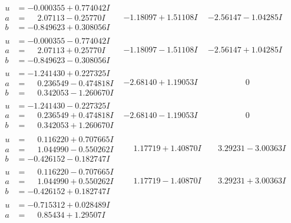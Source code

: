 \documentclass[1p]{elsarticle_modified}
\theoremstyle{definition}
\begin{document}
$$\begin{array}{c|c|c}
 \hline 
\begin{aligned}
u &= -0.000355 + 0.774042 I \\
a &= \phantom{-}2.07113 - 0.25770 I \\
b &= -0.849623 + 0.308056 I\end{aligned}
 & -1.18097 + 1.51108 I & -2.56147 - 1.04285 I \\ \hline\begin{aligned}
u &= -0.000355 - 0.774042 I \\
a &= \phantom{-}2.07113 + 0.25770 I \\
b &= -0.849623 - 0.308056 I\end{aligned}
 & -1.18097 - 1.51108 I & -2.56147 + 1.04285 I \\ \hline\begin{aligned}
u &= -1.241430 + 0.227325 I \\
a &= \phantom{-}0.236549 - 0.474818 I \\
b &= \phantom{-}0.342053 - 1.260670 I\end{aligned}
 & -2.68140 + 1.19053 I & \phantom{-0.000000 } 0 \\ \hline\begin{aligned}
u &= -1.241430 - 0.227325 I \\
a &= \phantom{-}0.236549 + 0.474818 I \\
b &= \phantom{-}0.342053 + 1.260670 I\end{aligned}
 & -2.68140 - 1.19053 I & \phantom{-0.000000 } 0 \\ \hline\begin{aligned}
u &= \phantom{-}0.116220 + 0.707665 I \\
a &= \phantom{-}1.044990 - 0.550262 I \\
b &= -0.426152 - 0.182747 I\end{aligned}
 & \phantom{-}1.17719 + 1.40870 I & \phantom{-}3.29231 - 3.00363 I \\ \hline\begin{aligned}
u &= \phantom{-}0.116220 - 0.707665 I \\
a &= \phantom{-}1.044990 + 0.550262 I \\
b &= -0.426152 + 0.182747 I\end{aligned}
 & \phantom{-}1.17719 - 1.40870 I & \phantom{-}3.29231 + 3.00363 I \\ \hline\begin{aligned}
u &= -0.715312 + 0.028489 I \\
a &= \phantom{-}0.85434 + 1.29507 I \\

\end{aligned}
\end{array}$$
\end{document}
